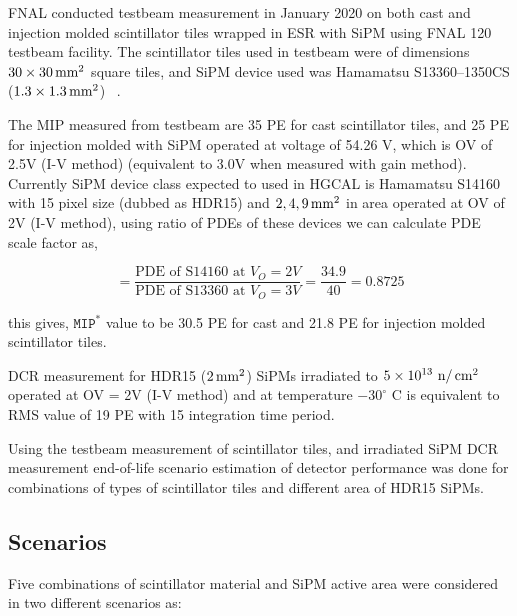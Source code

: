 \gls{FNAL} conducted testbeam measurement in January 2020 on both cast and injection
molded scintillator tiles wrapped in \gls{ESR} with \gls{SiPM}
using \gls{FNAL} 120 \GeV{} testbeam facility. The scintillator tiles
used in testbeam were of dimensions \( 30 \times 30 \,\text{mm}{}^{2} \) square tiles,
and \gls{SiPM} device used was Hamamatsu S13360--1350CS (\( 1.3 \times 1.3 \,\text{mm}{}^{2} \))
~\cite{mppc-13360,testbeam-fnal-2020}.

The \gls{MIP} measured from testbeam are 35 \gls{PE} for cast scintillator tiles,
and 25 \gls{PE} for injection molded with \gls{SiPM} operated at
voltage of 54.26 V, which is \gls{OV} of 2.5V (I-V method) (equivalent
to 3.0V when measured with gain method).
Currently \gls{SiPM} device class expected to used in \gls{HGCAL}
is Hamamatsu S14160 with 15\micron{} pixel size (dubbed as HDR15)
and \(2, 4, 9 \,\text{mm}{}^{2} \) in
area operated at \gls{OV} of 2V (I-V method),
using ratio of \glspl{PDE} of these devices
we can calculate PDE scale factor as,

\begin{equation}
  = \frac{\text{PDE of S14160 at } V_O = 2V}
  {\text{PDE of S13360 at } V_O = 3V}
  = \frac{34.9}{40}
  = 0.8725
\end{equation}

this gives, \( \texttt{MIP}^{*} \) value to be 30.5 \gls{PE} for cast
and 21.8 \gls{PE} for injection molded scintillator tiles.

\gls{DCR} measurement for HDR15 (\( 2 \,\text{mm}{}^2 \)) \glspl{SiPM}
irradiated to \( 5 \times {10}^{13} \text{ n}/\,\text{cm}{}^2 \)
operated at \gls{OV} = 2V (I-V method) and at temperature \( -30^{\circ} \text{ C}\)
is equivalent to \gls{RMS} value of 19 \gls{PE} with 15 \nanoseconds{} integration time
period.

Using the testbeam measurement of scintillator tiles, and irradiated \gls{SiPM}
\gls{DCR} measurement end-of-life scenario estimation of
detector performance was done for combinations
of types of scintillator tiles and different area of HDR15 \glspl{SiPM}.

\subsection{
  Scenarios
}

Five combinations of scintillator material and \gls{SiPM} active area
were considered in two different scenarios as:

